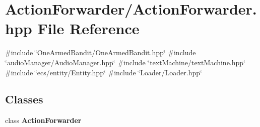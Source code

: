 \section{Action\+Forwarder/\+Action\+Forwarder.hpp File Reference}
\label{_action_forwarder_8hpp}
{\ttfamily \#include \char`\"{}One\+Armed\+Bandit/\+One\+Armed\+Bandit.\+hpp\char`\"{}}\newline
{\ttfamily \#include \char`\"{}audio\+Manager/\+Audio\+Manager.\+hpp\char`\"{}}\newline
{\ttfamily \#include \char`\"{}text\+Machine/text\+Machine.\+hpp\char`\"{}}\newline
{\ttfamily \#include \char`\"{}ecs/entity/\+Entity.\+hpp\char`\"{}}\newline
{\ttfamily \#include \char`\"{}Loader/\+Loader.\+hpp\char`\"{}}\newline
\subsection*{Classes}
\begin{DoxyCompactItemize}
\item 
class \textbf{ Action\+Forwarder}
\end{DoxyCompactItemize}
